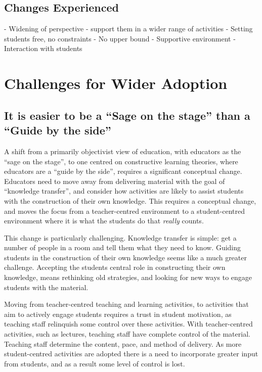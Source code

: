 
\subsection{Changes Experienced} %
\label{sub:changes_experienced}

- Widening of perspective - support them in a wider range of activities
- Setting students free, no constraints
- No upper bound
- Supportive environment
- Interaction with students



\clearpage
\section{Challenges for Wider Adoption} %
\label{sec:challenges_for_wider_adoption}

\subsection{It is easier to be a ``Sage on the stage'' than a ``Guide by the side''} %
\label{sub:adopting_constructive_learning_theories}

A shift from a primarily objectivist view of education, with educators as the ``sage on the stage'', to one centred on constructive learning theories, where educators are a ``guide by the side'', requires a significant conceptual change. Educators need to move away from delivering material with the goal of ``knowledge transfer'', and consider how activities are likely to assist students with the construction of their own knowledge. This requires a conceptual change, and moves the focus from a teacher-centred environment to a student-centred environment where it is what the students do that \emph{really} counts.

This change is particularly challenging. Knowledge transfer is simple: get a number of people in a room and tell them what they need to know. Guiding students in the construction of their own knowledge seems like a much greater challenge. Accepting the students central role in constructing their own knowledge, means rethinking old strategies, and looking for new ways to engage students with the material. 

Moving from teacher-centred teaching and learning activities, to activities that aim to actively engage students requires a trust in student motivation, as teaching staff relinquish some control over these activities. With teacher-centred activities, such as lectures, teaching staff have complete control of the material. Teaching staff determine the content, pace, and method of delivery. As more student-centred activities are adopted there is a need to incorporate greater input from students, and as a result some level of control is lost. 


